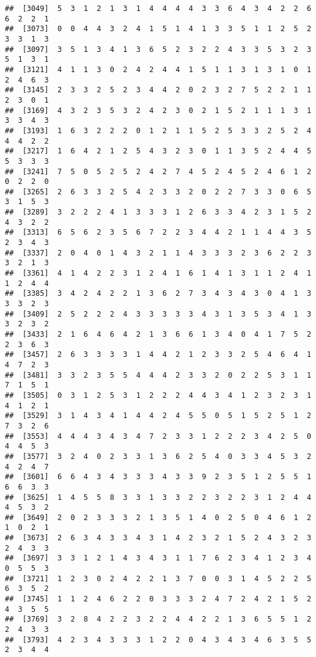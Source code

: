 \documentclass[
]{article}
\begin{document}
\begin{verbatim}
##  [3049]  5  3  1  2  1  3  1  4  4  4  4  3  3  6  4  3  4  2  2  6  6  2  2  1
##  [3073]  0  0  4  4  3  2  4  1  5  1  4  1  3  3  5  1  1  2  5  2  3  3  1  3
##  [3097]  3  5  1  3  4  1  3  6  5  2  3  2  2  4  3  3  5  3  2  3  5  1  3  1
##  [3121]  4  1  1  3  0  2  4  2  4  4  1  5  1  1  3  1  3  1  0  1  2  4  6  3
##  [3145]  2  3  3  2  5  2  3  4  4  2  0  2  3  2  7  5  2  2  1  1  2  3  0  1
##  [3169]  4  3  2  3  5  3  2  4  2  3  0  2  1  5  2  1  1  1  3  1  3  3  4  3
##  [3193]  1  6  3  2  2  2  0  1  2  1  1  5  2  5  3  3  2  5  2  4  4  4  2  2
##  [3217]  1  6  4  2  1  2  5  4  3  2  3  0  1  1  3  5  2  4  4  5  5  3  3  3
##  [3241]  7  5  0  5  2  5  2  4  2  7  4  5  2  4  5  2  4  6  1  2  0  2  2  0
##  [3265]  2  6  3  3  2  5  4  2  3  3  2  0  2  2  7  3  3  0  6  5  3  1  5  3
##  [3289]  3  2  2  2  4  1  3  3  3  1  2  6  3  3  4  2  3  1  5  2  4  3  2  2
##  [3313]  6  5  6  2  3  5  6  7  2  2  3  4  4  2  1  1  4  4  3  5  2  3  4  3
##  [3337]  2  0  4  0  1  4  3  2  1  1  4  3  3  3  2  3  6  2  2  3  3  2  1  3
##  [3361]  4  1  4  2  2  3  1  2  4  1  6  1  4  1  3  1  1  2  4  1  1  2  4  4
##  [3385]  3  4  2  4  2  2  1  3  6  2  7  3  4  3  4  3  0  4  1  3  3  3  2  3
##  [3409]  2  5  2  2  2  4  3  3  3  3  3  4  3  1  3  5  3  4  1  3  3  2  3  2
##  [3433]  2  1  6  4  6  4  2  1  3  6  6  1  3  4  0  4  1  7  5  2  2  3  6  3
##  [3457]  2  6  3  3  3  3  1  4  4  2  1  2  3  3  2  5  4  6  4  1  4  7  2  3
##  [3481]  3  3  2  3  5  5  4  4  4  2  3  3  2  0  2  2  5  3  1  1  7  1  5  1
##  [3505]  0  3  1  2  5  3  1  2  2  2  4  4  3  4  1  2  3  2  3  1  4  1  2  1
##  [3529]  3  1  4  3  4  1  4  4  2  4  5  5  0  5  1  5  2  5  1  2  7  3  2  6
##  [3553]  4  4  4  3  4  3  4  7  2  3  3  1  2  2  2  3  4  2  5  0  4  4  5  3
##  [3577]  3  2  4  0  2  3  3  1  3  6  2  5  4  0  3  3  4  5  3  2  4  2  4  7
##  [3601]  6  6  4  3  4  3  3  3  4  3  3  9  2  3  5  1  2  5  5  1  6  6  3  3
##  [3625]  1  4  5  5  8  3  3  1  3  3  2  2  3  2  2  3  1  2  4  4  4  5  3  2
##  [3649]  2  0  2  3  3  3  2  1  3  5  1  4  0  2  5  0  4  6  1  2  1  0  2  1
##  [3673]  2  6  3  4  3  3  4  3  1  4  2  3  2  1  5  2  4  3  2  3  2  4  3  3
##  [3697]  3  3  1  2  1  4  3  4  3  1  1  7  6  2  3  4  1  2  3  4  0  5  5  3
##  [3721]  1  2  3  0  2  4  2  2  1  3  7  0  0  3  1  4  5  2  2  5  6  3  5  2
##  [3745]  1  1  2  4  6  2  2  0  3  3  3  2  4  7  2  4  2  1  5  2  4  3  5  5
##  [3769]  3  2  8  4  2  2  3  2  2  4  4  2  2  1  3  6  5  5  1  2  2  4  3  3
##  [3793]  4  2  3  4  3  3  3  1  2  2  0  4  3  4  3  4  6  3  5  5  2  3  4  4

\end{verbatim}
\end{document}
